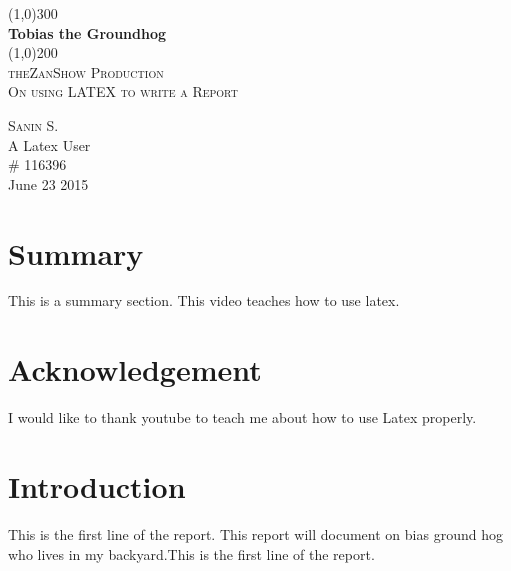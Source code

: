 \documentclass{article}
\begin{document}
\begin{titlepage}
	\begin{center}
		\line(1,0){300}\\
		[0.25in]
		\huge{\bfseries Tobias the Groundhog}\\
		[2mm]
		\line(1,0){200}\\
		[1.5cm]
		\textsc{\LARGE theZanShow Production }\\
		[0.1in]
		\textsc{\Large On using LATEX to write a Report}\\
		[10cm]
	\end{center}
	\begin{flushright}
		\textsc{\large Sanin S.\\}
		A Latex User \\
		\# 116396\\
		June 23 2015
	\end{flushright}
\end{titlepage}

\section*{Summary}%
This is a summary section. This video teaches how to use latex.
\cleardoublepage

\section*{Acknowledgement}
I would like to thank youtube to teach me about how to use Latex properly.
\cleardoublepage

\tableofcontents
\thispagestyle{empty}
\cleardoublepage

\listoffigures
{}
\cleardoublepage

\listoftables
{}
\cleardoublepage

\setcounter{page}{1}

\section{Introduction}\label{sec:intro}
This is the first line of the report. This report will document on bias ground hog who lives in my backyard.This is the first line of the report. 
\end{document}
